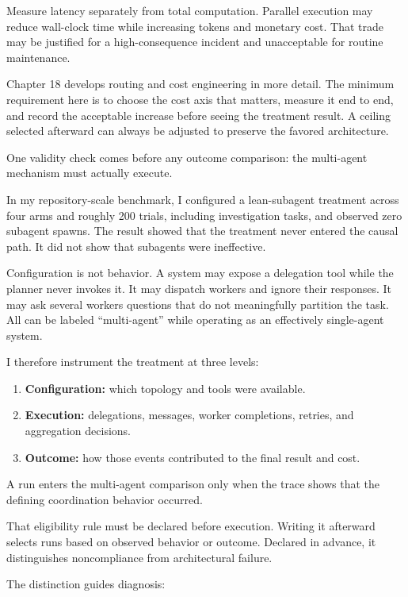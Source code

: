 Measure latency separately from total computation. Parallel execution may reduce wall-clock time while increasing tokens and monetary cost. That trade may be justified for a high-consequence incident and unacceptable for routine maintenance.

Chapter 18 develops routing and cost engineering in more detail. The minimum requirement here is to choose the cost axis that matters, measure it end to end, and record the acceptable increase before seeing the treatment result. A ceiling selected afterward can always be adjusted to preserve the favored architecture.

One validity check comes before any outcome comparison: the multi-agent mechanism must actually execute.

In my repository-scale benchmark, I configured a lean-subagent treatment across four arms and roughly 200 trials, including investigation tasks, and observed zero subagent spawns. The result showed that the treatment never entered the causal path. It did not show that subagents were ineffective.

Configuration is not behavior. A system may expose a delegation tool while the planner never invokes it. It may dispatch workers and ignore their responses. It may ask several workers questions that do not meaningfully partition the task. All can be labeled ``multi-agent'' while operating as an effectively single-agent system.

I therefore instrument the treatment at three levels:

\begin{enumerate}
\def\labelenumi{\arabic{enumi}.}
\tightlist
\item
  \textbf{Configuration:} which topology and tools were available.
\item
  \textbf{Execution:} delegations, messages, worker completions, retries, and aggregation decisions.
\item
  \textbf{Outcome:} how those events contributed to the final result and cost.
\end{enumerate}

A run enters the multi-agent comparison only when the trace shows that the defining coordination behavior occurred.

That eligibility rule must be declared before execution. Writing it afterward selects runs based on observed behavior or outcome. Declared in advance, it distinguishes noncompliance from architectural failure.

The distinction guides diagnosis:

